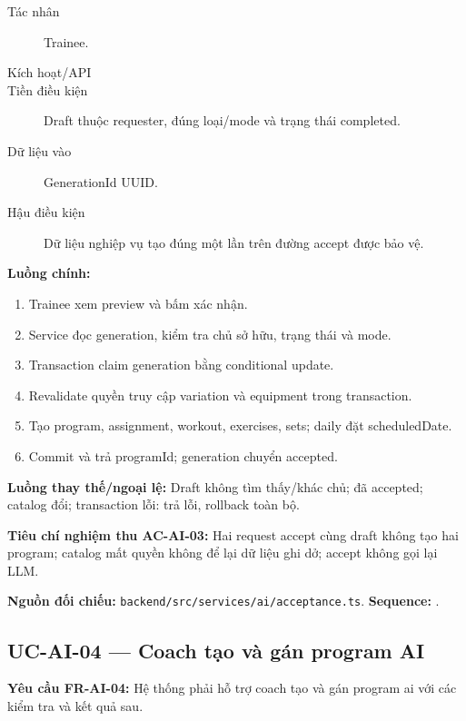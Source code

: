 \documentclass[12pt,a4paper]{article}
\newcommand{\evidence}[1]{{\small\nolinkurl{#1}}}
\begin{document}
\begin{description}
\item[Tác nhân] Trainee.
\item[Kích hoạt/API] 
\item[Tiền điều kiện] Draft thuộc requester, đúng loại/mode và trạng thái completed.
\item[Dữ liệu vào] GenerationId UUID.
\item[Hậu điều kiện] Dữ liệu nghiệp vụ tạo đúng một lần trên đường accept được bảo vệ.
\end{description}
\textbf{Luồng chính:}
\begin{enumerate}
  \item Trainee xem preview và bấm xác nhận.
  \item Service đọc generation, kiểm tra chủ sở hữu, trạng thái và mode.
  \item Transaction claim generation bằng conditional update.
  \item Revalidate quyền truy cập variation và equipment trong transaction.
  \item Tạo program, assignment, workout, exercises, sets; daily đặt scheduledDate.
  \item Commit và trả programId; generation chuyển accepted.
\end{enumerate}
\textbf{Luồng thay thế/ngoại lệ:} Draft không tìm thấy/khác chủ; đã accepted; catalog đổi; transaction lỗi: trả lỗi, rollback toàn bộ.

\textbf{Tiêu chí nghiệm thu AC-AI-03:} Hai request accept cùng draft không tạo hai program; catalog mất quyền không để lại dữ liệu ghi dở; accept không gọi lại LLM.

\textbf{Nguồn đối chiếu:} \evidence{backend/src/services/ai/acceptance.ts}. \textbf{Sequence:} .

\subsection{UC-AI-04 --- Coach tạo và gán program AI}
\label{uc-ai-4}
\textbf{Yêu cầu FR-AI-04:} Hệ thống phải hỗ trợ coach tạo và gán program ai với các kiểm tra và kết quả sau.
\end{document}
